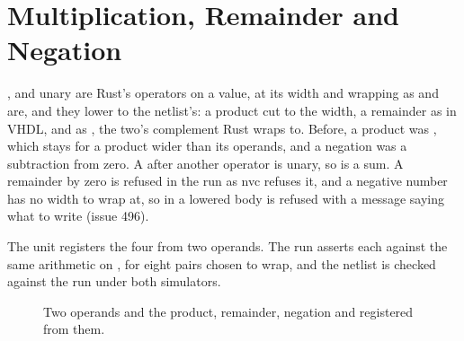 \section{Multiplication, Remainder and Negation}
\label{sec:x-arith}

\code{*}, \code{\%} and unary \code{-} are Rust's operators on a value,
at its width and wrapping as \code{+} and \code{-} are, and they lower
to the netlist's: a product cut to the width, a remainder as
 in VHDL, and  as , the two's
complement Rust wraps to. Before, a product was
, which stays for a product wider than its
operands, and a negation was a subtraction from zero. A \code{-}
after another operator is unary, so  is a sum. A
remainder by zero is refused in the run as nvc refuses it, and a
negative number has no width to wrap at, so  in a lowered
body is refused with a message saying what to write (issue 496).

The unit registers the four from two operands. The run asserts each
against the same arithmetic on , for eight pairs chosen to
wrap, and the netlist is checked against the run under both
simulators.

\begin{figure}[htbp]
\centering

\caption{Two operands and the product, remainder, negation and
 registered from them.}
\label{fig:x-arith}
\end{figure}




